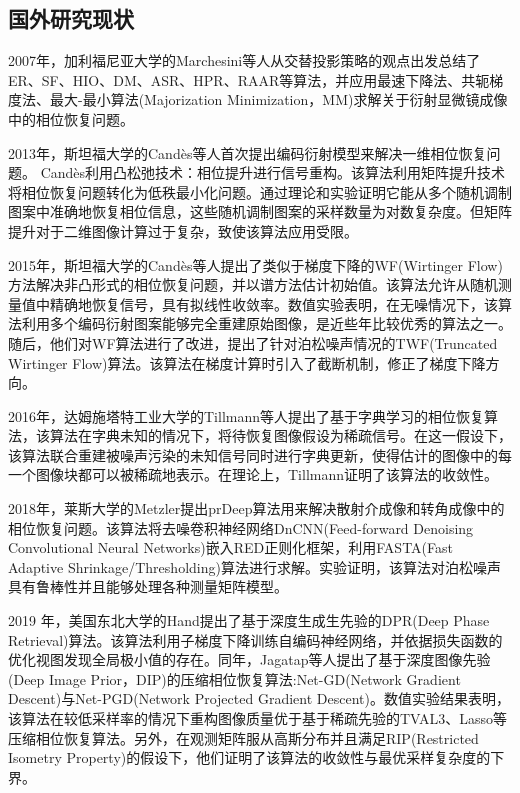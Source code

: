 \subsection{国外研究现状}
2007年，加利福尼亚大学的Marchesini等人从交替投影策略的观点出发总结了ER、SF、HIO、DM、ASR、HPR、RAAR等算法，并应用最速下降法、共轭梯度法、最大-最小算法(Majorization Minimization，MM)求解关于衍射显微镜成像中的相位恢复问题。

2013年，斯坦福大学的Cand{\`e}s等人首次提出编码衍射模型来解决一维相位恢复问题。 Cand{\`e}s利用凸松弛技术：相位提升进行信号重构。该算法利用矩阵提升技术将相位恢复问题转化为低秩最小化问题。通过理论和实验证明它能从多个随机调制图案中准确地恢复相位信息，这些随机调制图案的采样数量为对数复杂度。但矩阵提升对于二维图像计算过于复杂，致使该算法应用受限\supercite{Candes}。

2015年，斯坦福大学的Cand{\`e}s等人提出了类似于梯度下降的WF(Wirtinger Flow)方法解决非凸形式的相位恢复问题，并以谱方法估计初始值。该算法允许从随机测量值中精确地恢复信号，具有拟线性收敛率。数值实验表明，在无噪情况下，该算法利用多个编码衍射图案能够完全重建原始图像，是近些年比较优秀的算法之一。随后，他们对WF算法进行了改进，提出了针对泊松噪声情况的TWF(Truncated Wirtinger Flow)算法。该算法在梯度计算时引入了截断机制，修正了梯度下降方向\supercite{Gross}。 

2016年，达姆施塔特工业大学的Tillmann等人提出了基于字典学习的相位恢复算法，该算法在字典未知的情况下，将待恢复图像假设为稀疏信号。在这一假设下，该算法联合重建被噪声污染的未知信号同时进行字典更新，使得估计的图像中的每一个图像块都可以被稀疏地表示。在理论上，Tillmann证明了该算法的收敛性\supercite{Tillmann}。

2018年，莱斯大学的Metzler提出prDeep算法用来解决散射介成像和转角成像中的相位恢复问题。该算法将去噪卷积神经网络DnCNN(Feed-forward Denoising Convolutional Neural Networks)嵌入RED正则化框架，利用FASTA(Fast Adaptive Shrinkage/Thresholding)算法进行求解。实验证明，该算法对泊松噪声具有鲁棒性并且能够处理各种测量矩阵模型\supercite{Metzler1}。

2019 年，美国东北大学的Hand提出了基于深度生成生先验的DPR(Deep Phase Retrieval)算法。该算法利用子梯度下降训练自编码神经网络，并依据损失函数的优化视图发现全局极小值的存在\supercite{Hand}。同年，Jagatap等人提出了基于深度图像先验(Deep Image Prior，DIP)的压缩相位恢复算法:Net-GD(Network Gradient Descent)与Net-PGD(Network Projected Gradient Descent)。数值实验结果表明，该算法在较低采样率的情况下重构图像质量优于基于稀疏先验的TVAL3、Lasso等压缩相位恢复算法。另外，在观测矩阵服从高斯分布并且满足RIP(Restricted Isometry Property)的假设下，他们证明了该算法的收敛性与最优采样复杂度的下界\supercite{Jagatap}。

